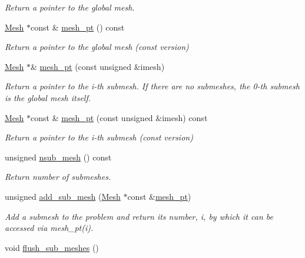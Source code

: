 \begin{DoxyCompactItemize}
\begin{DoxyCompactList}\small\item\em Return a pointer to the global mesh. \end{DoxyCompactList}\item 
\hyperlink{classoomph_1_1Mesh}{Mesh} $\ast$const  \& \hyperlink{classoomph_1_1Problem_a3a2e53542288a4140ea5b076ffa648db}{mesh\+\_\+pt} () const
\begin{DoxyCompactList}\small\item\em Return a pointer to the global mesh (const version) \end{DoxyCompactList}\item 
\hyperlink{classoomph_1_1Mesh}{Mesh} $\ast$\& \hyperlink{classoomph_1_1Problem_a6dafb68ef8d4765978ad5d162ebb61f6}{mesh\+\_\+pt} (const unsigned \&imesh)
\begin{DoxyCompactList}\small\item\em Return a pointer to the i-\/th submesh. If there are no submeshes, the 0-\/th submesh is the global mesh itself. \end{DoxyCompactList}\item 
\hyperlink{classoomph_1_1Mesh}{Mesh} $\ast$const  \& \hyperlink{classoomph_1_1Problem_a35b503d711781552b6b56deb612816c4}{mesh\+\_\+pt} (const unsigned \&imesh) const
\begin{DoxyCompactList}\small\item\em Return a pointer to the i-\/th submesh (const version) \end{DoxyCompactList}\item 
unsigned \hyperlink{classoomph_1_1Problem_accc4e5a46953800933f07ae6bd67860e}{nsub\+\_\+mesh} () const
\begin{DoxyCompactList}\small\item\em Return number of submeshes. \end{DoxyCompactList}\item 
unsigned \hyperlink{classoomph_1_1Problem_a0cd05109bc2c003c5c0686e6aa55d847}{add\+\_\+sub\+\_\+mesh} (\hyperlink{classoomph_1_1Mesh}{Mesh} $\ast$const \&\hyperlink{classoomph_1_1Problem_aad122d70a22dc5302cfd5853d3cf3057}{mesh\+\_\+pt})
\begin{DoxyCompactList}\small\item\em Add a submesh to the problem and return its number, i, by which it can be accessed via mesh\+\_\+pt(i). \end{DoxyCompactList}\item 
void \hyperlink{classoomph_1_1Problem_a42b2b42a03f9de7d7a4d24edcfa20179}{flush\+\_\+sub\+\_\+meshes} ()

\end{DoxyCompactItemize}
